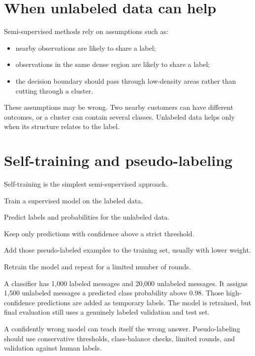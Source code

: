 \section{When unlabeled data can help}

Semi-supervised methods rely on assumptions such as:

\begin{itemize}
  \item nearby observations are likely to share a label;
  \item observations in the same dense region are likely to share a label;
  \item the decision boundary should pass through low-density areas rather than cutting through a cluster.
\end{itemize}

These assumptions may be wrong. Two nearby customers can have different outcomes, or a cluster can contain several classes. Unlabeled data helps only when its structure relates to the label.

\section{Self-training and pseudo-labeling}

Self-training is the simplest semi-supervised approach.

\begin{mlsteps}
  \item Train a supervised model on the labeled data.
  \item Predict labels and probabilities for the unlabeled data.
  \item Keep only predictions with confidence above a strict threshold.
  \item Add those pseudo-labeled examples to the training set, usually with lower weight.
  \item Retrain the model and repeat for a limited number of rounds.
\end{mlsteps}

\begin{workedexample}
A classifier has 1,000 labeled messages and 20,000 unlabeled messages. It assigns 1,500 unlabeled messages a predicted class probability above 0.98. Those high-confidence predictions are added as temporary labels. The model is retrained, but final evaluation still uses a genuinely labeled validation and test set.
\end{workedexample}

\begin{pitfall}
A confidently wrong model can teach itself the wrong answer. Pseudo-labeling should use conservative thresholds, class-balance checks, limited rounds, and validation against human labels.
\end{pitfall}

